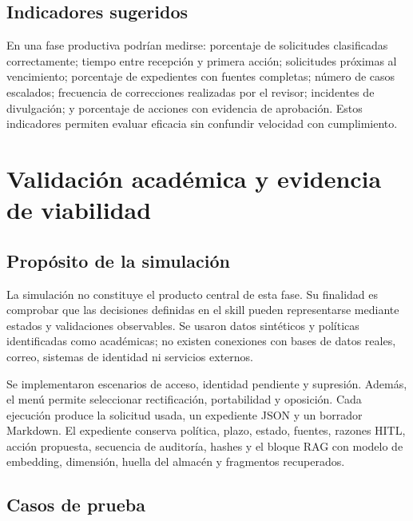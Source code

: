 \documentclass[11pt,a4paper]{article}
\begin{document}
\subsection{Indicadores sugeridos}

En una fase productiva podrían medirse: porcentaje de solicitudes clasificadas correctamente; tiempo entre recepción y primera acción; solicitudes próximas al vencimiento; porcentaje de expedientes con fuentes completas; número de casos escalados; frecuencia de correcciones realizadas por el revisor; incidentes de divulgación; y porcentaje de acciones con evidencia de aprobación. Estos indicadores permiten evaluar eficacia sin confundir velocidad con cumplimiento.

\section{Validación académica y evidencia de viabilidad}

\subsection{Propósito de la simulación}

La simulación no constituye el producto central de esta fase. Su finalidad es comprobar que las decisiones definidas en el skill pueden representarse mediante estados y validaciones observables. Se usaron datos sintéticos y políticas identificadas como académicas; no existen conexiones con bases de datos reales, correo, sistemas de identidad ni servicios externos.

Se implementaron escenarios de acceso, identidad pendiente y supresión. Además, el menú permite seleccionar rectificación, portabilidad y oposición. Cada ejecución produce la solicitud usada, un expediente JSON y un borrador Markdown. El expediente conserva política, plazo, estado, fuentes, razones HITL, acción propuesta, secuencia de auditoría, hashes y el bloque RAG con modelo de embedding, dimensión, huella del almacén y fragmentos recuperados.

\subsection{Casos de prueba}
\end{document}
